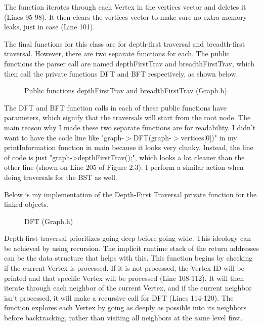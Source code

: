 \documentclass[letterpaper, 10pt]{article}
\begin{document}
\noindent
The function iterates through each Vertex in the vertices vector and deletes it (Lines 95-98). It then clears the vertices vector to make sure no extra memory leaks, just in case (Line 101).

\vspace{1em}
\noindent
The final functions for this class are for depth-first traversal and breadth-first traversal. However, there are two separate functions for each. The public functions the parser call are named depthFirstTrav and breadthFirstTrav, which then call the private functions DFT and BFT respectively, as shown below.

\begin{figure}[H]
  \centering
   
  \label{fig:figure2.18-part1}
\end{figure}

\vspace{-3em}

\begin{figure}[H]
  \centering
   
  \caption{Public functions depthFirstTrav and breadthFirstTrav (Graph.h)}
  \label{fig:figure2.18-part2}
\end{figure}

\noindent
The DFT and BFT function calls in each of these public functions have parameters, which signify that the traversals will start from the root node. The main reason why I made these two separate functions are for readability. I didn't want to have the code line like "graph-$>$DFT(graph-$>$vertices[0])" in my printInformation function in main because it looks very clunky. Instead, the line of code is just "graph->depthFirstTrav();", which looks a lot cleaner than the other line (shown on Line 205 of Figure 2.3). I perform a similar action when doing traversals for the BST as well.

\vspace{1em}

\noindent
Below is my implementation of the Depth-First Traversal private function for the linked objects.
\begin{figure}[H]
  \centering
   
  \caption{DFT (Graph.h)}
  \label{fig:figure2.19}
\end{figure}

\noindent
Depth-first traversal prioritizes going deep before going wide. This ideology can be achieved by using recursion. The implicit runtime stack of the return addresses can be the data structure that helps with this. This function begins by checking if the current Vertex is processed. If it is not processed, the Vertex ID will be printed and that specific Vertex will be processed (Line 108-112). It will then iterate through each neighbor of the current Vertex, and if the current neighbor isn't processed, it will make a recursive call for DFT (Lines 114-120). The function explores each Vertex by going as deeply as possible into its neighbors before backtracking, rather than visiting all neighbors at the same level first.
\end{document}
